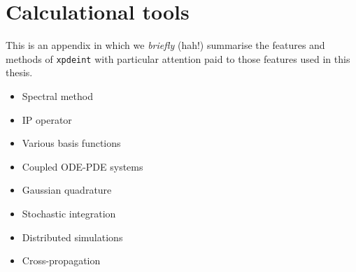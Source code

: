\chapter{Calculational tools}
\label{ToolsAppendix}
\graphicspath{{Figures/ToolsAppendix/}{Figures/Common/}}

This is an appendix in which we \emph{briefly} (hah!) summarise the features and methods of \texttt{xpdeint} with particular attention paid to those features used in this thesis.

\begin{itemize}
    \item Spectral method
    \item IP operator
    \item Various basis functions
    \item Coupled ODE-PDE systems
    \item Gaussian quadrature
    \item Stochastic integration
    \item Distributed simulations
    \item Cross-propagation
\end{itemize}